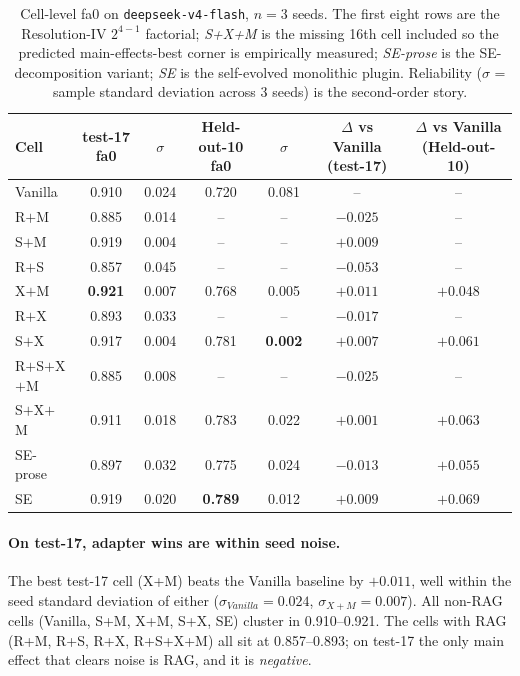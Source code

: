 \documentclass{article}
\begin{document}
\begin{table}[t]
  \caption{Cell-level fa0 on \texttt{deepseek-v4-flash}, $n=3$ seeds. The first eight rows are the Resolution-IV $2^{4-1}$ factorial; \emph{S+X+M} is the missing 16th cell included so the predicted main-effects-best corner is empirically measured; \emph{SE-prose} is the SE-decomposition variant; \emph{SE} is the self-evolved monolithic plugin. Reliability ($\sigma$ = sample standard deviation across 3 seeds) is the second-order story.}
  \label{tab:main-results}
  \centering
  \small
  \begin{tabular}{lcccccc}
    \toprule
    \textbf{Cell} & \textbf{test-17 fa0} & \textbf{$\sigma$} & \textbf{Held-out-10 fa0} & \textbf{$\sigma$} & \textbf{$\Delta$ vs Vanilla (test-17)} & \textbf{$\Delta$ vs Vanilla (Held-out-10)} \\
    \midrule
    Vanilla        & 0.910 & 0.024 & 0.720 & 0.081 & --       & --       \\
    R$+$M          & 0.885 & 0.014 & --    & --    & $-0.025$ & --       \\
    S$+$M          & 0.919 & 0.004 & --    & --    & $+0.009$ & --       \\
    R$+$S          & 0.857 & 0.045 & --    & --    & $-0.053$ & --       \\
    X$+$M          & \textbf{0.921} & 0.007 & 0.768 & 0.005 & $\mathbf{+0.011}$ & $+0.048$ \\
    R$+$X          & 0.893 & 0.033 & --    & --    & $-0.017$ & --       \\
    S$+$X          & 0.917 & 0.004 & 0.781 & \textbf{0.002} & $+0.007$ & $+0.061$ \\
    R$+$S$+$X$+$M  & 0.885 & 0.008 & --    & --    & $-0.025$ & --       \\
    S$+$X$+$M      & 0.911 & 0.018 & 0.783 & 0.022 & $+0.001$ & $+0.063$ \\
    SE-prose       & 0.897 & 0.032 & 0.775 & 0.024 & $-0.013$ & $+0.055$ \\
    SE             & 0.919 & 0.020 & \textbf{0.789} & 0.012 & $+0.009$ & $\mathbf{+0.069}$ \\
    \bottomrule
  \end{tabular}
\end{table}

\paragraph{On test-17, adapter wins are within seed noise.} The best test-17 cell (X+M) beats the Vanilla baseline by $+0.011$, well within the seed standard deviation of either ($\sigma_{Vanilla}=0.024$, $\sigma_{X+M}=0.007$). All non-RAG cells (Vanilla, S+M, X+M, S+X, SE) cluster in 0.910--0.921. The cells with RAG (R+M, R+S, R+X, R+S+X+M) all sit at 0.857--0.893; on test-17 the only main effect that clears noise is RAG, and it is \emph{negative}.
\end{document}
